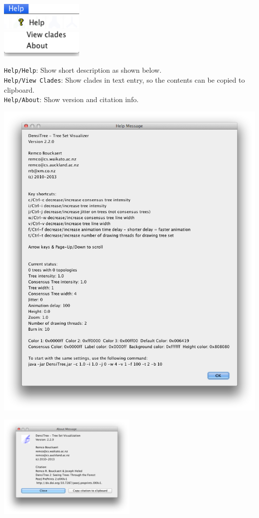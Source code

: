 \documentclass{article}
\begin{document}
\begin{center}
\includegraphics[width=4cm]{menuhelp.png}
\end{center}

\noindent
{\tt Help/Help}: Show short description as shown below.\\
{\tt Help/View Clades}: Show clades in text entry, so the contents can be copied to clipboard.\\
{\tt Help/About}: Show version and citation info.

\begin{center}
\includegraphics[width=\textwidth]{help.png}
\end{center}

\begin{center}
\includegraphics[width=0.5\textwidth]{about.png}
\end{center}
\end{document}
